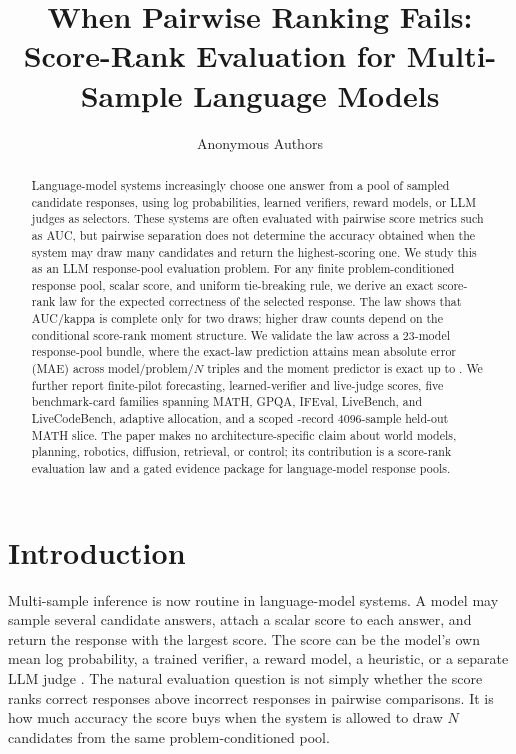 \documentclass{article}
\title{When Pairwise Ranking Fails: Score-Rank Evaluation for Multi-Sample Language Models}
\author{Anonymous Authors}
\begin{document}
\maketitle

\begin{abstract}
Language-model systems increasingly choose one answer from a pool of sampled
candidate responses, using log probabilities, learned verifiers, reward
models, or LLM judges as selectors. These systems are often evaluated with
pairwise score metrics such as AUC, but pairwise separation does not determine
the accuracy obtained when the system may draw many candidates and return the
highest-scoring one. We study this as an LLM response-pool evaluation problem.
For any finite problem-conditioned response pool, scalar score, and uniform
tie-breaking rule, we derive an exact score-rank law for the expected
correctness of the selected response. The law shows that AUC/kappa is complete
only for two draws; higher draw counts depend on the conditional score-rank
moment structure. We validate the law across a 23-model response-pool bundle,
where the exact-law prediction attains mean absolute error (MAE)
\EvidenceCoreMAE{} across \EvidenceTriples{} model/problem/$N$ triples and the
moment predictor is exact up to \EvidenceMomentMaxMAE{}. We further report
finite-pilot forecasting, learned-verifier and live-judge scores, five
benchmark-card families spanning MATH, GPQA, IFEval, LiveBench, and
LiveCodeBench, adaptive allocation, and a scoped
\EvidenceHeldoutRecords{}-record 4096-sample held-out MATH slice. The paper
makes no architecture-specific claim about world models,
planning, robotics, diffusion, retrieval, or control; its contribution is a
score-rank evaluation law and a gated evidence package for language-model
response pools.
\end{abstract}

\section{Introduction}

Multi-sample inference is now routine in language-model systems. A model may
sample several candidate answers, attach a scalar score to each answer, and
return the response with the largest score. The score can be the model's own
mean log probability, a trained verifier, a reward model, a heuristic, or a
separate LLM judge \citep{cobbe2021training,zheng2023judging}. The natural
evaluation question is not simply whether the score ranks correct responses
above incorrect responses in pairwise comparisons. It is how much accuracy the
score buys when the system is allowed to draw $N$ candidates from the same
problem-conditioned pool.
\end{document}
